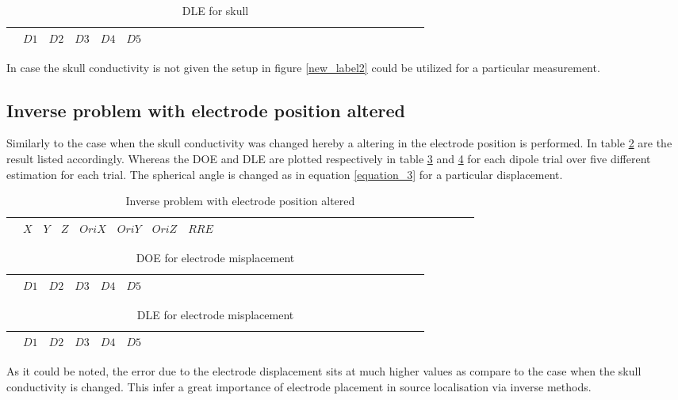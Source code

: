 \begin{table}[!htbp]
\centering
\caption{DLE for skull}\label{Ta12}
\begin{tabular}{c c c c c c c c c c c c c c c c c c c c c c c c c c c c c c c }
\hline 
$ $&$D1$&$D2$&$D3$&$D4$&$D5$\\
\hline
 
\hline 
\end{tabular}
\end{table}

In case the skull conductivity is not given the setup in figure \ref{new_label2} could be utilized for a particular measurement. 

\newpage
\subsection{Inverse problem with electrode position altered}

Similarly to the case when the skull conductivity was changed hereby a altering in the electrode position is performed. In table \ref{Ta2} are the result listed accordingly. Whereas the DOE and DLE are plotted respectively in table \ref{Ta21} and \ref{Ta22} for each dipole trial over five different estimation for each trial. The spherical angle is changed as in equation \ref{equation_3} for a particular displacement.


\begin{table}[!htbp]
\centering
\caption{Inverse problem with electrode position altered}\label{Ta2}
\begin{tabular}{c c c c c c c c c c c c c c c c c c c c c c c c c c c c c c c }
\hline 
$ $&$X$&$Y$&$Z$&$OriX$&$OriY$&$OriZ$&$RRE$\\
\hline
 
\hline 
\end{tabular}
\end{table}



\begin{table}[!htbp]
\centering
\caption{DOE for electrode misplacement}\label{Ta21}
\begin{tabular}{c c c c c c c c c c c c c c c c c c c c c c c c c c c c c c c }
\hline 
$ $&$D1$&$D2$&$D3$&$D4$&$D5$\\
\hline
 
\hline 
\end{tabular}
\end{table}

\begin{table}[!htbp]
\centering
\caption{DLE for electrode misplacement}\label{Ta22}
\begin{tabular}{c c c c c c c c c c c c c c c c c c c c c c c c c c c c c c c }
\hline 
$ $&$D1$&$D2$&$D3$&$D4$&$D5$\\
\hline
 
\hline 
\end{tabular}
\end{table}

As it could be noted, the error due to the electrode displacement sits at much higher values as compare to the case when the skull conductivity is changed. This infer a great importance of electrode placement in source localisation via inverse methods.